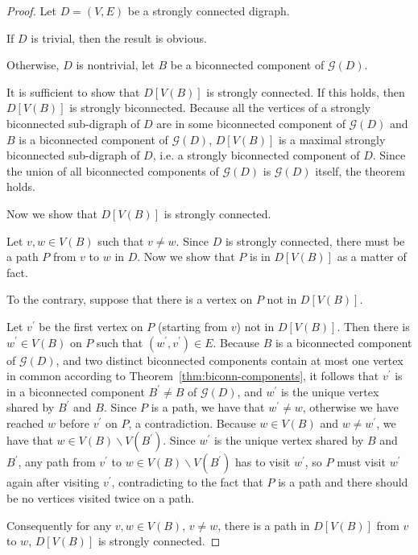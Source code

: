 \documentclass{article}
\begin{document}
\begin{proof}

Let $D=(V,E)$ be a strongly connected digraph.

If $D$ is trivial, then the result is obvious.

Otherwise, $D$ is nontrivial, let $B$ be a biconnected component of
$\mathcal{G}(D)$.

It is sufficient to show that $D[V(B)]$ is strongly connected. If
this holds, then $D[V(B)]$ is strongly biconnected. Because all the
vertices of a strongly biconnected sub-digraph of $D$ are in some
 biconnected component of $\mathcal{G}(D)$ and $B$ is a biconnected component of $\mathcal{G}(D)$,
$D[V(B)]$ is a maximal strongly biconnected sub-digraph of $D$, i.e.
a strongly biconnected component of $D$. Since the union of all
biconnected components of $\mathcal{G}(D)$ is $\mathcal{G}(D)$
itself, the theorem holds.

Now we show that $D[V(B)]$ is strongly connected.

Let $v,w \in V(B)$ such that $v \ne w$. Since $D$ is strongly
connected, there must be a path $P$ from $v$ to $w$ in $D$. Now we
show that $P$ is in $D[V(B)]$ as a matter of fact.

To the contrary, suppose that there is a vertex on $P$ not in
$D[V(B)]$.

Let $v^\prime$ be the first vertex on $P$ (starting from $v$) not in
$D[V(B)]$. Then there is $w^\prime \in V(B)$ on $P$ such that
$(w^\prime,v^\prime) \in E$. Because $B$ is a biconnected component
of $\mathcal{G}(D)$, and two distinct biconnected components contain
at most one vertex in common according to
Theorem~\ref{thm:biconn-components}, it follows that $v^\prime$ is
in a biconnected component $B^\prime \neq B$ of $\mathcal{G}(D)$,
and $w^\prime$ is the unique vertex shared by $B^\prime$ and $B$.
Since $P$ is a path, we have that $w^\prime \ne w$, otherwise we
have reached $w$ before $v^\prime$ on $P$, a contradiction. Because
$w \in V(B)$ and $w \ne w^\prime$, we have that $w \in V(B)
\backslash V(B^\prime)$. Since $w^\prime$ is the unique vertex
shared by $B$ and $B^\prime$, any path from $v^\prime$ to $w \in
V(B) \backslash V(B^\prime)$ has to visit $w^\prime$, so $P$ must
visit $w^\prime$ again after visiting $v^\prime$, contradicting to
the fact that $P$ is a path and there should be no vertices visited
twice on a path.

Consequently for any $v,w \in V(B)$, $v \ne w$, there is a path in
$D[V(B)]$ from $v$ to $w$, $D[V(B)]$ is strongly connected.
\end{proof}
\end{document}
